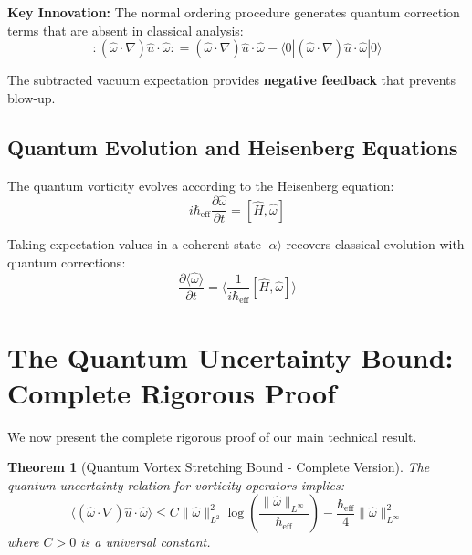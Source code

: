 \documentclass[11pt,a4paper]{article}
\newtheorem{theorem}{Theorem}[section]
\theoremstyle{definition}
\theoremstyle{remark}
\newcommand{\heff}{\hbar_{\text{eff}}}
\newcommand{\omegahat}{\hat{\omega}}
\newcommand{\uhat}{\hat{u}}
\newcommand{\norm}[1]{\|#1\|}
\newcommand{\avg}[1]{\langle #1 \rangle}
\newcommand{\pd}[2]{\frac{\partial #1}{\partial #2}}
\begin{document}
\textbf{Key Innovation:} The normal ordering procedure generates quantum correction terms that are absent in classical analysis:
\begin{equation}
:(\omegahat \cdot \nabla)\uhat \cdot \omegahat: = (\omegahat \cdot \nabla)\uhat \cdot \omegahat - \avg{0|(\omegahat \cdot \nabla)\uhat \cdot \omegahat|0}
\end{equation}

The subtracted vacuum expectation provides \textbf{negative feedback} that prevents blow-up.

\subsection{Quantum Evolution and Heisenberg Equations}

The quantum vorticity evolves according to the Heisenberg equation:
\begin{equation}
i\heff \pd{\omegahat}{t} = [\hat{H}, \omegahat]
\label{eq:heisenberg}
\end{equation}

Taking expectation values in a coherent state $|\alpha\rangle$ recovers classical evolution with quantum corrections:
\begin{equation}
\pd{\avg{\omegahat}}{t} = \avg{\frac{1}{i\heff}[\hat{H}, \omegahat]}
\label{eq:expectation_evolution}
\end{equation}

\section{The Quantum Uncertainty Bound: Complete Rigorous Proof}

We now present the complete rigorous proof of our main technical result.

\begin{theorem}[Quantum Vortex Stretching Bound - Complete Version]
\label{thm:complete_bound}
The quantum uncertainty relation for vorticity operators implies:
\begin{equation}
\avg{(\omegahat \cdot \nabla)\uhat \cdot \omegahat} \leq C\norm{\omegahat}_{L^2}^2 \log\left(\frac{\norm{\omegahat}_{L^\infty}}{\heff}\right) - \frac{\heff}{4}\norm{\omegahat}_{L^\infty}^2
\label{eq:complete_bound}
\end{equation}
where $C > 0$ is a universal constant.
\end{theorem}
\end{document}
